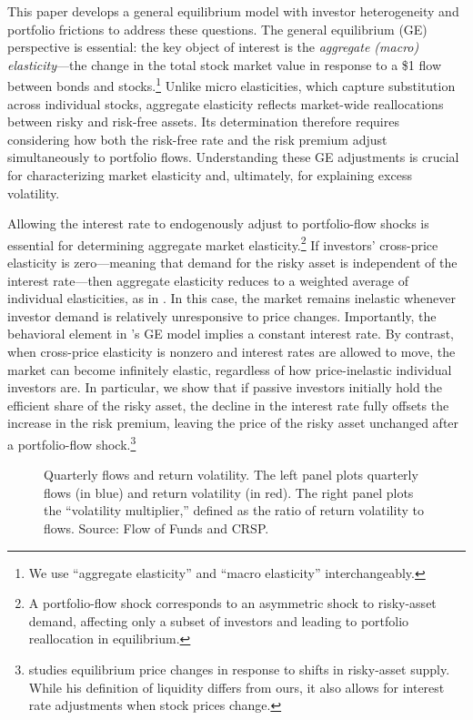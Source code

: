 This paper develops a general equilibrium model with investor heterogeneity and portfolio frictions to address these questions. The general equilibrium (GE) perspective is essential: the key object of interest is the \emph{aggregate (macro) elasticity}—the change in the total stock market value in response to a \$1 flow between bonds and stocks.\footnote{We use ``aggregate elasticity'' and ``macro elasticity'' interchangeably.} Unlike micro elasticities, which capture substitution across individual stocks, aggregate elasticity reflects market-wide reallocations between risky and risk-free assets. Its determination therefore requires considering how both the risk-free rate and the risk premium adjust simultaneously to portfolio flows. Understanding these GE adjustments is crucial for characterizing market elasticity and, ultimately, for explaining excess volatility.
  

Allowing the interest rate to endogenously adjust to portfolio-flow shocks is essential for determining aggregate market elasticity.\footnote{A portfolio-flow shock corresponds to an asymmetric shock to risky-asset demand, affecting only a subset of investors and leading to portfolio reallocation in equilibrium.} If investors’ cross-price elasticity is zero—meaning that demand for the risky asset is independent of the interest rate—then aggregate elasticity reduces to a weighted average of individual elasticities, as in \citet{gabaix2020search}. In this case, the market remains inelastic whenever investor demand is relatively unresponsive to price changes. Importantly, the behavioral element in \citeauthor{gabaix2020search}'s GE model implies a constant interest rate. By contrast, when cross-price elasticity is nonzero and interest rates are allowed to move, the market can become infinitely elastic, regardless of how price-inelastic individual investors are. In particular, we show that if passive investors initially hold the efficient share of the risky asset, the decline in the interest rate fully offsets the increase in the risk premium, leaving the price of the risky asset unchanged after a portfolio-flow shock.\footnote{\citet{johnson2006dynamic} studies equilibrium price changes in response to shifts in risky-asset supply. While his definition of liquidity differs from ours, it also allows for interest rate adjustments when stock prices change.}

\begin{figure}[!t]
    \centering
    \subfloat{\resizebox{0.49\textwidth}{!}{}}
    \subfloat{\resizebox{0.49\textwidth}{!}{}}
    \vspace{2mm}
    \caption{Quarterly flows and return volatility. The left panel plots quarterly flows (in blue) and return volatility (in red). The right panel plots the ``volatility multiplier,'' defined as the ratio of return volatility to flows. Source: Flow of Funds and CRSP.}\label{fig:facts-vol-flow}
\end{figure}

